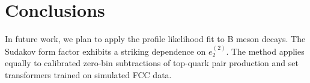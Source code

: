 \section{Conclusions}\label{sec:conclusions}

In future work, we plan to apply the profile likelihood fit to B meson
decays. The Sudakov form factor exhibits a striking dependence on
$e_2^{(2)}$. The method applies equally to calibrated zero-bin
subtractions of top-quark pair production and set transformers trained
on simulated FCC data.

